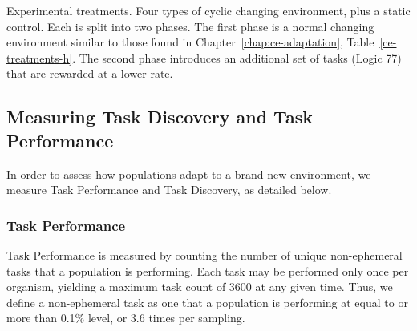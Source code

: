 \documentclass[PhD]{msu-thesis}
\begin{document}
\begin{table}[]
\begin{tabular}{|c|c||c|c||c|c|c|}
	\end{tabular} 

	\begin{flushleft} Experimental treatments. Four types of cyclic changing environment, plus a static control. Each is split into two phases. 
    The first phase is a normal changing environment similar to those found in Chapter~\ref{chap:ce-adaptation}, Table~\ref{ce-treatments-h}. The second phase introduces an additional set of tasks (Logic 77) that are rewarded at a lower rate.
	\end{flushleft}
	\label{cel-treatments}
	\end{table}


\subsection{Measuring Task Discovery and Task Performance}
In order to assess how populations adapt to a brand new environment, we measure Task Performance and Task Discovery, as detailed below.

\subsubsection{Task Performance}
Task Performance is measured by counting the number of unique non-ephemeral tasks that a population is performing.  Each task may be performed only once per organism, yielding a maximum task count of 3600 at any given time. Thus, we define a non-ephemeral task as one that a population is performing at equal to or more than 0.1\% level, or 3.6 times per sampling. 
\end{document}
